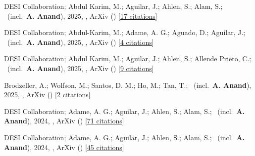 \item[{\color{numcolor}\scriptsize10}] DESI Collaboration; Abdul Karim, M.; Aguilar, J.; Ahlen, S.; Alam, S.; \etal\ (incl.\ \textbf{A. Anand}), 2025, , ArXiv () [\href{https://ui.adsabs.harvard.edu/abs/2025arXiv250314738D}{17 citations}]

\item[{\color{numcolor}\scriptsize9}] DESI Collaboration; Abdul-Karim, M.; Adame, A. G.; Aguado, D.; Aguilar, J.; \etal\ (incl.\ \textbf{A. Anand}), 2025, , ArXiv () [\href{https://ui.adsabs.harvard.edu/abs/2025arXiv250314745D}{4 citations}]

\item[{\color{numcolor}\scriptsize8}] DESI Collaboration; Abdul Karim, M.; Aguilar, J.; Ahlen, S.; Allende Prieto, C.; \etal\ (incl.\ \textbf{A. Anand}), 2025, , ArXiv () [\href{https://ui.adsabs.harvard.edu/abs/2025arXiv250314739D}{9 citations}]

\item[{\color{numcolor}\scriptsize7}] Brodzeller, A.; Wolfson, M.; Santos, D. M.; Ho, M.; Tan, T.; \etal\ (incl.\ \textbf{A. Anand}), 2025, , ArXiv () [\href{https://ui.adsabs.harvard.edu/abs/2025arXiv250314740B}{2 citations}]

\item[{\color{numcolor}\scriptsize6}] DESI Collaboration; Adame, A. G.; Aguilar, J.; Ahlen, S.; Alam, S.; \etal\ (incl.\ \textbf{A. Anand}), 2024, , ArXiv () [\href{https://ui.adsabs.harvard.edu/abs/2024arXiv241112022D}{71 citations}]

\item[{\color{numcolor}\scriptsize5}] DESI Collaboration; Adame, A. G.; Aguilar, J.; Ahlen, S.; Alam, S.; \etal\ (incl.\ \textbf{A. Anand}), 2024, , ArXiv () [\href{https://ui.adsabs.harvard.edu/abs/2024arXiv241112021D}{45 citations}]

